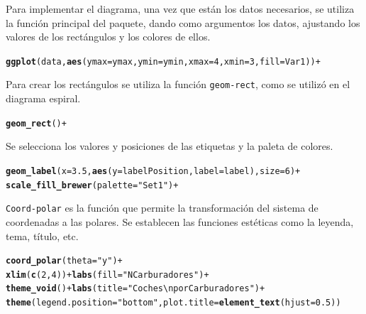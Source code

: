 \documentclass{article}\usepackage[]{graphicx}\usepackage[]{color}
\makeatletter
\newcommand{\hlnum}[1]{\textcolor[rgb]{0.686,0.059,0.569}{#1}}%
\newcommand{\hlstr}[1]{\textcolor[rgb]{0.192,0.494,0.8}{#1}}%
\newcommand{\hlopt}[1]{\textcolor[rgb]{0,0,0}{#1}}%
\newcommand{\hlstd}[1]{\textcolor[rgb]{0.345,0.345,0.345}{#1}}%
\newcommand{\hlkwc}[1]{\textcolor[rgb]{0.333,0.667,0.333}{#1}}%
\newcommand{\hlkwd}[1]{\textcolor[rgb]{0.737,0.353,0.396}{\textbf{#1}}}%
\newenvironment{kframe}{%
 \def\at@end@of@kframe{}%
 \ifinner\ifhmode%
  \def\at@end@of@kframe{\end{minipage}}%
  \begin{minipage}{\columnwidth}%
 \fi\fi%
 \def\FrameCommand##1{\hskip\@totalleftmargin \hskip-\fboxsep
 \colorbox{shadecolor}{##1}\hskip-\fboxsep
     \hskip-\linewidth \hskip-\@totalleftmargin \hskip\columnwidth}%
 \MakeFramed {\advance\hsize-\width
   \@totalleftmargin\z@ \linewidth\hsize
   \@setminipage}}%
 {\par\unskip\endMakeFramed%
 \at@end@of@kframe}
\newenvironment{knitrout}{}{} %
\makeatother
\begin{document}
Para implementar el diagrama, una vez que est\'an los datos necesarios, se utiliza la funci\'on principal del paquete, dando como argumentos los datos, ajustando los valores de los rect\'angulos y los colores de ellos.
\begin{knitrout}
\color{fgcolor}\begin{kframe}
\begin{alltt}
\hlkwd{ggplot}(data, \hlkwd{aes}(ymax=ymax, ymin=ymin, xmax=4, xmin=3, fill=Var1)) +
\end{alltt}
\end{kframe}
\end{knitrout}
Para crear los rect\'angulos se utiliza la funci\'on \texttt{geom-rect}, como se utiliz\'o en el diagrama espiral.
\begin{knitrout}
\color{fgcolor}\begin{kframe}
\begin{alltt}
  \hlkwd{geom_rect}() +
\end{alltt}
\end{kframe}
\end{knitrout}
Se selecciona los valores y posiciones de las etiquetas y la paleta de colores.
\begin{knitrout}
\color{fgcolor}\begin{kframe}
\begin{alltt}
  \hlkwd{geom_label}( x=3.5, \hlkwd{aes}(y=labelPosition, label=label), size=6) +
  \hlkwd{scale_fill_brewer}(palette=\hlstr{"Set1"}) +
\end{alltt}
\end{kframe}
\end{knitrout}
\texttt{Coord-polar} es la funci\'on que permite la transformaci\'on del sistema de coordenadas a las polares. Se establecen las funciones est\'eticas como la leyenda, tema, t\'itulo, etc.
\begin{knitrout}
\color{fgcolor}\begin{kframe}
\begin{alltt}
  \hlkwd{coord_polar}\hlstd{(}\hlkwc{theta}\hlstd{=}\hlstr{"y"}\hlstd{)} \hlopt{+}
  \hlkwd{xlim}\hlstd{(}\hlkwd{c}\hlstd{(}\hlnum{2}\hlstd{,} \hlnum{4}\hlstd{))} \hlopt{+} \hlkwd{labs}\hlstd{(}\hlkwc{fill} \hlstd{=} \hlstr{"N Carburadores"}\hlstd{)} \hlopt{+}
  \hlkwd{theme_void}\hlstd{()} \hlopt{+} \hlkwd{labs}\hlstd{(}\hlkwc{title}\hlstd{=}\hlstr{"Coches\textbackslash{}npor Carburadores"}\hlstd{)} \hlopt{+}
  \hlkwd{theme}\hlstd{(}\hlkwc{legend.position}\hlstd{=}\hlstr{"bottom"}\hlstd{,} \hlkwc{plot.title} \hlstd{=} \hlkwd{element_text}\hlstd{(}\hlkwc{hjust} \hlstd{=} \hlnum{0.5}\hlstd{))}
\end{alltt}
\end{kframe}
\end{knitrout}
\end{document}
